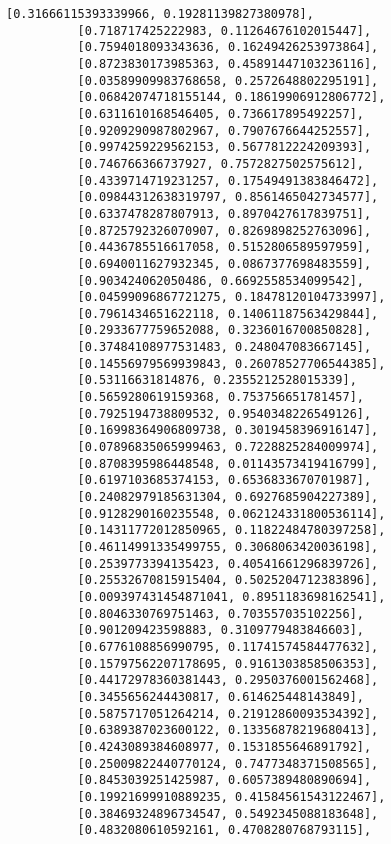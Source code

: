 \documentclass[11pt]{article}
\begin{document}
\begin{Verbatim}[commandchars=\\\{\}]
          [0.31666115393339966, 0.19281139827380978],
          [0.718717425222983, 0.11264676102015447],
          [0.7594018093343636, 0.16249426253973864],
          [0.8723830173985363, 0.45891447103236116],
          [0.03589909983768658, 0.2572648802295191],
          [0.06842074718155144, 0.18619906912806772],
          [0.6311610168546405, 0.736617895492257],
          [0.9209290987802967, 0.7907676644252557],
          [0.9974259229562153, 0.5677812224209393],
          [0.746766366737927, 0.7572827502575612],
          [0.4339714719231257, 0.17549491383846472],
          [0.09844312638319797, 0.8561465042734577],
          [0.6337478287807913, 0.8970427617839751],
          [0.8725792326070907, 0.8269898252763096],
          [0.4436785516617058, 0.5152806589597959],
          [0.6940011627932345, 0.0867377698483559],
          [0.903424062050486, 0.6692558534099542],
          [0.04599096867721275, 0.18478120104733997],
          [0.7961434651622118, 0.14061187563429844],
          [0.2933677759652088, 0.3236016700850828],
          [0.37484108977531483, 0.248047083667145],
          [0.14556979569939843, 0.26078527706544385],
          [0.53116631814876, 0.2355212528015339],
          [0.5659280619159368, 0.753756651781457],
          [0.7925194738809532, 0.9540348226549126],
          [0.16998364906809738, 0.3019458396916147],
          [0.07896835065999463, 0.7228825284009974],
          [0.8708395986448548, 0.01143573419416799],
          [0.6197103685374153, 0.6536833670701987],
          [0.24082979185631304, 0.6927685904227389],
          [0.9128290160235548, 0.062124331800536114],
          [0.14311772012850965, 0.11822484780397258],
          [0.46114991335499755, 0.3068063420036198],
          [0.2539773394135423, 0.40541661296839726],
          [0.25532670815915404, 0.5025204712383896],
          [0.009397431454871041, 0.8951183698162541],
          [0.8046330769751463, 0.703557035102256],
          [0.901209423598883, 0.3109779483846603],
          [0.6776108856990795, 0.11741574584477632],
          [0.15797562207178695, 0.9161303858506353],
          [0.44172978360381443, 0.2950376001562468],
          [0.3455656244430817, 0.614625448143849],
          [0.5875717051264214, 0.21912860093534392],
          [0.6389387023600122, 0.13356878219680413],
          [0.4243089384608977, 0.1531855646891792],
          [0.25009822440770124, 0.7477348371508565],
          [0.8453039251425987, 0.6057389480890694],
          [0.19921699910889235, 0.41584561543122467],
          [0.38469324896734547, 0.5492345088183648],
          [0.4832080610592161, 0.4708280768793115],

\end{Verbatim}
\end{document}
